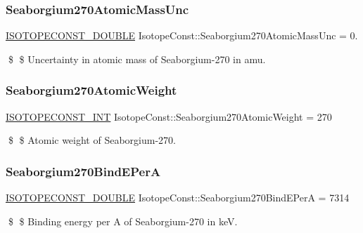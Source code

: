 \subsubsection{\texorpdfstring{Seaborgium270\+Atomic\+Mass\+Unc}{Seaborgium270AtomicMassUnc}}
{\footnotesize\ttfamily \mbox{\hyperlink{group___isotope_const-_macros_ga8f45a7272ce02c0b4c65c44636ed719a}{I\+S\+O\+T\+O\+P\+E\+C\+O\+N\+S\+T\+\_\+\+D\+O\+U\+B\+LE}} Isotope\+Const\+::\+Seaborgium270\+Atomic\+Mass\+Unc = 0.}

\$ \$ Uncertainty in atomic mass of Seaborgium-\/270 in amu. \mbox{\label{group___isotope_const-_seaborgium-_sg270_ga3476a4c1a63a3c1deaf3ee3d1b893aae}} 
\subsubsection{\texorpdfstring{Seaborgium270\+Atomic\+Weight}{Seaborgium270AtomicWeight}}
{\footnotesize\ttfamily \mbox{\hyperlink{group___isotope_const-_macros_ga5f18360b3e99483a35c32d789e62621c}{I\+S\+O\+T\+O\+P\+E\+C\+O\+N\+S\+T\+\_\+\+I\+NT}} Isotope\+Const\+::\+Seaborgium270\+Atomic\+Weight = 270}

\$ \$ Atomic weight of Seaborgium-\/270. \mbox{\label{group___isotope_const-_seaborgium-_sg270_ga2dbf1b2c7c2b1cf5c18eea7a226dc446}} 
\subsubsection{\texorpdfstring{Seaborgium270\+Bind\+E\+PerA}{Seaborgium270BindEPerA}}
{\footnotesize\ttfamily \mbox{\hyperlink{group___isotope_const-_macros_ga8f45a7272ce02c0b4c65c44636ed719a}{I\+S\+O\+T\+O\+P\+E\+C\+O\+N\+S\+T\+\_\+\+D\+O\+U\+B\+LE}} Isotope\+Const\+::\+Seaborgium270\+Bind\+E\+PerA = 7314}

\$ \$ Binding energy per A of Seaborgium-\/270 in keV. \mbox{\label{group___isotope_const-_seaborgium-_sg270_gab607c69070fb4d46af9996465214885b}} 
